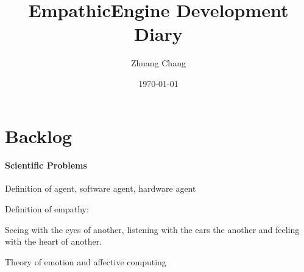 \documentclass{article}
\begin{document}
\title{EmpathicEngine Development Diary}
\author{Zhuang Chang}
\date{\today}

\maketitle


\tableofcontents
\section{Backlog}
\paragraph{Scientific Problems}

Definition of agent, software agent, hardware agent

Definition of empathy:

Seeing with the eyes of another, listening with the ears the another and feeling with 
the heart of another.


Theory of emotion and affective computing
\end{document}
